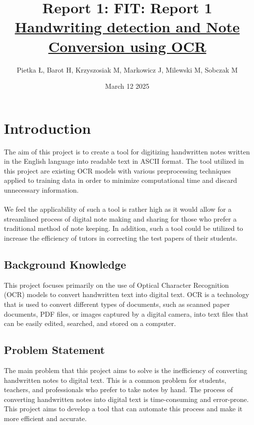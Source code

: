 \documentclass[twoside,a4paper]{article}
\title{Report 1: }
\title{\textbf{FIT: Report 1} \\[1ex] \Large \underline{Handwriting detection and Note Conversion using OCR}
}
\author{Pietka Ł, Barot H, Krzyszosiak M, Markowicz J, Milewski M, Sobczak M}
\date{March 12 2025}
\begin{document}
\maketitle
\tableofcontents
\newpage
\section{Introduction}
The aim of this project is to create a tool for digitizing handwritten notes written in the English language into readable text in ASCII format. The tool utilized in this project are existing OCR models with various preprocessing techniques applied to training data in order to minimize computational time and discard unnecessary information. \\\\
We feel the applicability of such a tool is rather high as it would allow for a streamlined process of digital note making and sharing for those who prefer a traditional method of note keeping. In addition, such a tool could be utilized to increase the efficiency of tutors in correcting the test papers of their students.

\subsection{Background Knowledge}
This project focuses primarily on the use of Optical Character Recognition (OCR) models to convert handwritten text into digital text. 
OCR is a technology that is used to convert different types of documents, such as scanned paper documents, PDF files, or images captured by a digital camera, into text files that can be easily edited, searched, and stored on a computer.\\




\subsection{Problem Statement}
The main problem that this project aims to solve is the inefficiency of converting handwritten notes to digital text. 
This is a common problem for students, teachers, and professionals who prefer to take notes by hand. 
The process of converting handwritten notes into digital text is time-consuming and error-prone. 
This project aims to develop a tool that can automate this process and make it more efficient and accurate. \\
 
\end{document}
